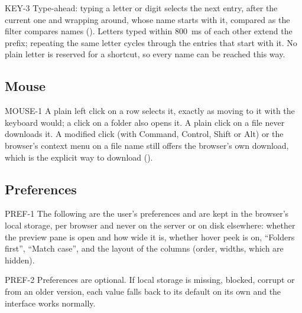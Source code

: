 \begin{req}{KEY-3}
Type-ahead: typing a letter or digit selects the next entry, after the current one
and wrapping around, whose name starts with it, compared as the filter compares names
().  Letters typed within 800~ms of each other extend the prefix; repeating
the same letter cycles through the entries that start with it.  No plain letter is
reserved for a shortcut, so every name can be reached this way.
\end{req}

\subsection{Mouse}

\begin{req}{MOUSE-1}
A plain left click on a row selects it, exactly as moving to it with the keyboard
would; a click on a folder also opens it.  A plain click on a file never downloads it.
A modified click (with Command, Control, Shift or Alt) or the browser's context menu on
a file name still offers the browser's own download, which is the explicit way to
download ().
\end{req}

\subsection{Preferences}
\label{sec:prefs}

\begin{req}{PREF-1}
The following are the user's preferences and are kept in the browser's local storage,
per browser and never on the server or on disk elsewhere: whether the preview pane is
open and how wide it is, whether hover peek is on, ``Folders first'', ``Match case'',
and the layout of the columns (order, widths, which are hidden).
\end{req}

\begin{req}{PREF-2}
Preferences are optional.  If local storage is missing, blocked, corrupt or from an
older version, each value falls back to its default on its own and the interface works
normally.
\end{req}
